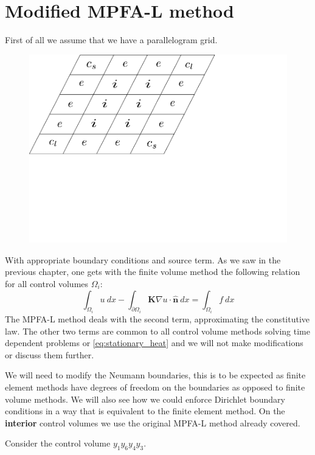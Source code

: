 \documentclass[../Main/main.tex]{subfiles}
\begin{document}
	\section*{Modified MPFA-L method}
	First of all we assume that we have a parallelogram grid.
	\begin{figure}[H]\label{fig:paralellogram mesh}
		\centering
		\includegraphics[width=1\textwidth]{paralellogram_mesh.pdf}
	\end{figure}
	With appropriate boundary conditions and source term.
	As we saw in the previous chapter, one gets with the finite volume method the following relation for all control volumes $\Omega_i$:
	\begin{equation}
		\int_{\Omega_i} u \ dx - \int_{\partial \Omega_i} \pmb{K}\nabla u \cdot \hat{\pmb{n}}\ dx = \int_{\Omega_i} f \ dx
	\end{equation}
	The MPFA-L method deals with the second term, approximating the constitutive law. The other two terms are common to all control volume methods solving time dependent problems or \eqref{eq:stationary_heat} and we will not make modifications or discuss them further.
	\par
	We will need to modify the Neumann boundaries, this is to be expected as finite element methods have degrees of freedom on the boundaries as opposed to finite volume methods. We will also see how we could enforce Dirichlet boundary conditions in a way that is equivalent to the finite element method. On the \textbf{interior} control volumes we use the original MPFA-L method already covered.
	\par
	Consider the control volume $y_1 y_6 y_4 y_3$. 
\end{document}
